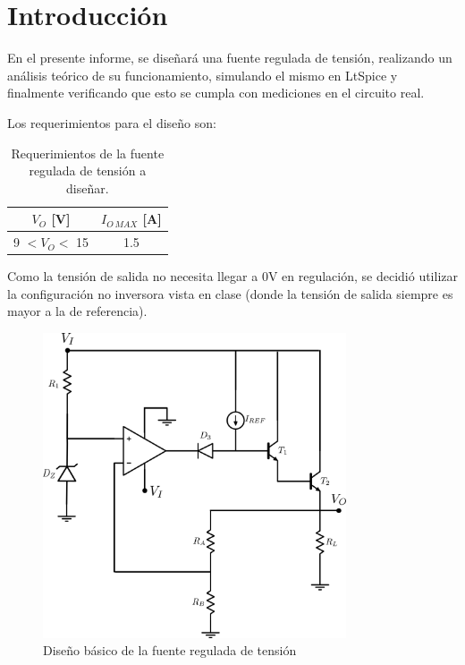 \documentclass[e2_tp1_main.tex]{subfiles}
\begin{document}
\section{Introducci\'on}

En el presente informe, se dise\~nar\'a una fuente regulada de tensi\'on, realizando un an\'alisis te\'orico de su funcionamiento, simulando el mismo en LtSpice y finalmente verificando que esto se cumpla con mediciones en el circuito real. 

Los requerimientos para el dise\~no son:
\begin{table}[ht!]
	\centering
	
	\begin{tabular}{|c|c|}
		\hline 
		$V_{O}$ [V] & $I_{O\, MAX}$ [A] \\ 
		\hline \hline
		9 $< V_O <$ 15 & 1.5 \\ 
		\hline 
		\end{tabular} 	
	
	\caption{Requerimientos de la fuente regulada de tensi\'on a dise\~nar.}
	\label{table:reqs}
\end{table}

Como la tensi\'on de salida no necesita llegar a 0V en regulaci\'on, se decidi\'o utilizar la configuraci\'on no inversora vista en clase (donde la tensi\'on de salida siempre es mayor a la de referencia).

\begin{figure}[htb]
	\centering
	\includegraphics[width=0.8\textwidth]
	{circuitos/circuito.png}
	\caption{Dise\~no b\'asico de la fuente regulada de tensi\'on}
	\label{fig:circ3}
\end{figure}
\end{document}
